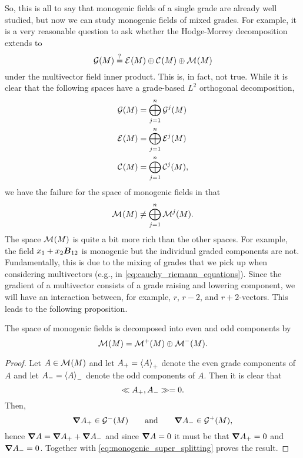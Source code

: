 So, this is all to say that monogenic fields of a single grade are already well studied, but now we can study monogenic fields of mixed grades. For example, it is a very reasonable question to ask whether the Hodge-Morrey decomposition extends to
    \begin{equation}
        \G(M) \stackrel{?}{=} \exactfields{} \oplus \coexactfields{} \oplus \monogenicfields{}
    \end{equation} 
under the multivector field inner product. This is, in fact, not true.  While it is clear that the following spaces have a grade-based $L^2$ orthogonal decomposition,
\begin{align}
    \G(M) &= \bigoplus_{j=1}^n \G^j(M)\\
    \exactfields{} &= \bigoplus_{j=1}^n \exactfields{j}\\
    \coexactfields{} &= \bigoplus_{j=1}^n \coexactfields{j},
\end{align}
we have the failure for the space of monogenic fields in that
\begin{equation}
    \monogenicfields{} \neq \bigoplus_{j=1}^n \monogenicfields{j}.
\end{equation}
The space $\monogenicfields{}$ is quite a bit more rich than the other spaces.  For example, the field $x_1+x_2 \blade{B}_{12}$ is monogenic but the individual graded components are not. Fundamentally, this is due to the mixing of grades that we pick up when considering multivectors (e.g., in \cref{eq:cauchy_riemann_equations}). Since the gradient of a multivector consists of a grade raising and lowering component, we will have an interaction between, for example, $r$, $r-2$, and $r+2$-vectors. This leads to the following proposition.

\begin{lemma}
The space of monogenic fields is decomposed into even and odd components by
\begin{equation}
    \monogenicfields{} = \monogenicfields{+} \oplus \monogenicfields{-}.
\end{equation}
\end{lemma}
\begin{proof}
Let $A \in \monogenicfields{}$ and let $A_+=\proj{+}{A}$ denote the even grade components of $A$ and let $A_-=\proj{-}{A}$ denote the odd components of $A$. Then it is clear that 
\begin{equation}
\label{eq:monogenic_super_splitting}
\multivecinnerproduct{A_+}{A_-} = 0.
\end{equation}
Then,
\begin{equation}
\grad A_+ \in \G^-(M) \qquad \textrm{and} \qquad \grad A_- \in \G^+(M),
\end{equation}
hence $\grad A = \grad A_+ + \grad A_-$ and since $\grad A=0$ it must be that $\grad A_+=0$ and $\grad A_-=0$. Together with \cref{eq:monogenic_super_splitting} proves the result.
\end{proof}

